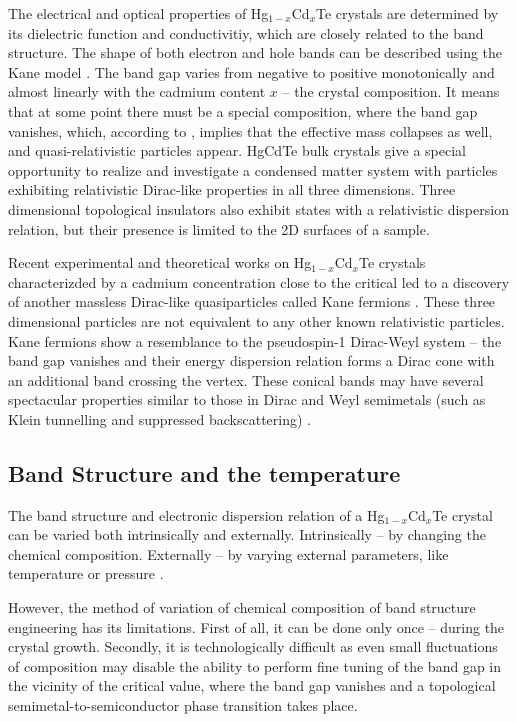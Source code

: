 \documentclass[titlepage,a4paper]{book}
\newcommand{\wciecie}{\quad\phantom{v}}
\begin{document}
The electrical and optical properties of Hg$_{1-x}$Cd$_x$Te crystals are determined by its dielectric function and conductivitiy, which are closely related to the band structure. The shape of both electron and hole bands can be described using the Kane model \cite{Kane_Model}. The band gap varies from negative to positive monotonically and almost linearly with the cadmium content $x$ -- the crystal composition. It means that at some point there must be a special composition, where the band gap vanishes, which, according to \cite{Zawadzki_Topology}, implies that the effective mass collapses as well, and quasi-relativistic particles appear. HgCdTe bulk crystals give a special opportunity to realize and investigate a condensed matter system with particles exhibiting relativistic Dirac-like properties in all three dimensions. Three dimensional topological insulators also exhibit states with a relativistic dispersion relation, but their presence is limited to the 2D surfaces of a sample.

Recent experimental \cite{Orlita_MCT} and theoretical \cite{Malcolm_MCT} works on Hg$_{1-x}$Cd$_x$Te crystals characterizded by a cadmium concentration close to the critical led to a discovery of another massless Dirac-like quasiparticles called Kane fermions \cite{Orlita_MCT}. These three dimensional particles are not equivalent to any other known relativistic particles. Kane fermions show a resemblance to the pseudospin-1 Dirac-Weyl system \cite{Malcolm_MCT} -- the band gap vanishes \cite{Weiler_MCT} and their energy dispersion relation forms a Dirac cone with an additional band crossing the vertex. These conical bands may have several spectacular properties similar to those in Dirac and Weyl semimetals (such as Klein tunnelling and suppressed backscattering) \cite{Orlita_MCT}. 

\subsection{Band Structure and the temperature}
\wciecie
The band structure and electronic dispersion relation of a Hg$_{1-x}$Cd$_x$Te crystal can be varied both intrinsically and externally. Intrinsically -- by changing the chemical composition. Externally -- by varying external parameters, like temperature \cite{Capper_MCT} or pressure \cite{Krishtopenko_pressure}. 

However, the method of variation of chemical composition of band structure engineering has its limitations. First of all, it can be done only once -- during the crystal growth. Secondly, it is technologically difficult as even small fluctuations of composition may disable the ability to perform fine tuning of the band gap in the vicinity of the critical value, where the band gap vanishes and a topological semimetal-to-semiconductor phase transition takes place.
\end{document}
